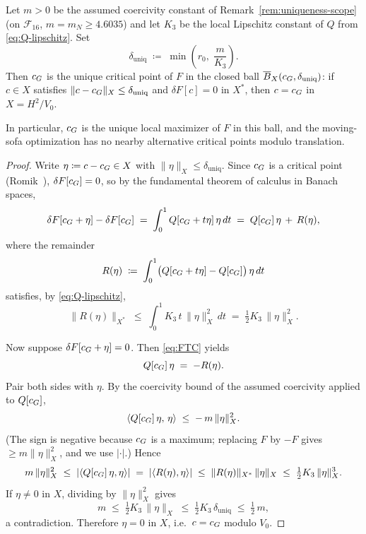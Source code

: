 \begin{theorem}\label{thm:uniqueness}
Let $m > 0$ be the assumed coercivity constant of
Remark~\ref{rem:uniqueness-scope} (on $\mathcal{F}_{16}$, $m = m_{N}
\geq 4.6035$)
and let $K_{3}$ be the local Lipschitz constant of $Q$ from
\eqref{eq:Q-lipschitz}.  Set
\begin{equation}\label{eq:delta-uniq}
   \delta_{\mathrm{uniq}}
   \;\coloneqq\; \min\!\left( r_{0},\; \frac{m}{K_{3}} \right).
\end{equation}
Then $c_{G}$ is the unique critical point of $F$ in the closed ball
$\overline{B}_{X}(c_{G},\delta_{\mathrm{uniq}})$: if $c \in X$ satisfies
$\|c - c_{G}\|_{X} \leq \delta_{\mathrm{uniq}}$ and $\delta F[c] = 0$
in $X^{*}$, then $c = c_{G}$ in $X = H^{2}/V_{0}$.

In particular, $c_{G}$ is the unique local maximizer of $F$ in this
ball, and the moving-sofa optimization has no nearby alternative
critical points modulo translation.
\end{theorem}

\begin{proof}
Write $\eta \coloneqq c - c_{G} \in X$ with $\|\eta\|_{X} \leq
\delta_{\mathrm{uniq}}$.  Since $c_{G}$ is a critical point
(Romik~\cite{Romik2018}), $\delta F[c_{G}] = 0$, so by the fundamental
theorem of calculus in Banach spaces,
\begin{equation}\label{eq:FTC}
   \delta F[c_{G} + \eta] - \delta F[c_{G}]
   \;=\; \int_{0}^{1} Q[c_{G} + t\eta]\,\eta \,dt
   \;=\; Q[c_{G}]\,\eta
        \,+\, R(\eta),
\end{equation}
where the remainder
\[
   R(\eta) \;\coloneqq\; \int_{0}^{1}
       \bigl(Q[c_{G} + t\eta] - Q[c_{G}]\bigr)\,\eta \,dt
\]
satisfies, by \eqref{eq:Q-lipschitz},
\begin{equation}\label{eq:R-bound}
   \|R(\eta)\|_{X^{*}}
   \;\leq\; \int_{0}^{1} K_{3}\, t\,\|\eta\|_{X}^{2}\,dt
   \;=\; \tfrac{1}{2} K_{3}\, \|\eta\|_{X}^{2}.
\end{equation}

Now suppose $\delta F[c_{G}+\eta] = 0$.  Then \eqref{eq:FTC} yields
\begin{equation}\label{eq:fixed-eq}
   Q[c_{G}]\,\eta \;=\; -R(\eta).
\end{equation}
Pair both sides with $\eta$.  By the coercivity bound of
the assumed coercivity applied to $Q[c_{G}]$,
\[
   \langle Q[c_{G}]\,\eta,\, \eta\rangle
   \;\leq\; -\,m\,\|\eta\|_{X}^{2}.
\]
(The sign is negative because $c_{G}$ is a maximum; replacing $F$ by
$-F$ gives $\geq m\|\eta\|_{X}^{2}$, and we use $|\cdot|$.)  Hence
\[
   m\,\|\eta\|_{X}^{2}
   \;\leq\; |\langle Q[c_{G}]\,\eta,\eta\rangle|
   \;=\; |\langle R(\eta),\eta\rangle|
   \;\leq\; \|R(\eta)\|_{X^{*}}\,\|\eta\|_{X}
   \;\leq\; \tfrac{1}{2} K_{3}\,\|\eta\|_{X}^{3}.
\]
If $\eta \neq 0$ in $X$, dividing by $\|\eta\|_{X}^{2}$ gives
\[
   m \;\leq\; \tfrac{1}{2} K_{3}\, \|\eta\|_{X}
   \;\leq\; \tfrac{1}{2} K_{3}\,\delta_{\mathrm{uniq}}
   \;\leq\; \tfrac{1}{2}\, m,
\]
a contradiction.  Therefore $\eta = 0$ in $X$, i.e.\ $c = c_{G}$
modulo $V_{0}$.
\end{proof}

